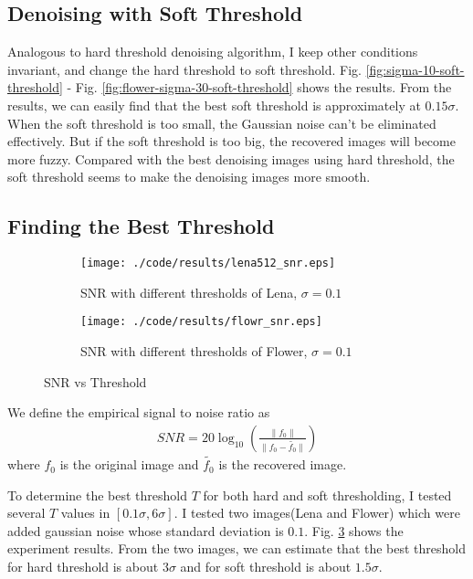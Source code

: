\documentclass[journal,comsoc]{IEEEtran}
\begin{document}
\subsection{Denoising with Soft Threshold}
\label{subsec:denoising-with-soft-thresholding}

Analogous to hard threshold denoising algorithm, I keep other conditions invariant, and
change the hard threshold to soft threshold. Fig. \ref{fig:sigma-10-soft-threshold} -
Fig. \ref{fig:flower-sigma-30-soft-threshold} shows the results. From the results, we can
easily find that the best soft threshold is approximately at $0.15\sigma$. When the
soft threshold is too small, the Gaussian noise can't be eliminated effectively. But
if the soft threshold is too big, the recovered images will become more fuzzy.
Compared with the best denoising images using hard threshold, the soft threshold seems
to make the denoising images more smooth.



\subsection{Finding the Best Threshold}
\label{subsec:finding-the-best-threshold}

\begin{figure}[!hbt]
  \centering
  \begin{subfigure}{.36\textwidth}
    \centering
    \texttt{[image: ./code/results/lena512\_snr.eps]}
    \caption{SNR with different thresholds of Lena, $\sigma=0.1$}
    \label{subfig:snr-threshold-lena}
  \end{subfigure}
  \begin{subfigure}{.36\textwidth}
    \centering
    \texttt{[image: ./code/results/flowr\_snr.eps]}
    \caption{SNR with different thresholds of Flower, $\sigma=0.1$}
    \label{subfig:snr-threshold-flower}
  \end{subfigure}
  \caption{SNR vs Threshold}
  \label{fig:snr-lena-flower}
\end{figure}

We define the empirical signal to noise ratio as
\begin{eqnarray}
  SNR=20\log_{10}(\frac{\|f_0\|}{\|f_0-\tilde{f_0}\|})
\end{eqnarray}
where $f_0$ is the original image and $\tilde{f_0}$ is the recovered image.

To determine the best threshold $T$ for both hard and soft thresholding, I tested several
$T$ values in $[0.1\sigma,6\sigma]$. I tested two images(Lena and Flower) which were added gaussian noise
whose standard deviation is $0.1$. Fig. \ref{fig:snr-lena-flower} shows the experiment results.
From the two images, we can estimate that the best threshold for hard threshold is about $3\sigma$
and for soft threshold is about $1.5\sigma$.
\end{document}

